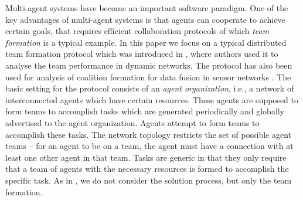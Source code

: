 \documentclass{llncs}
\begin{document}
Multi-agent systems have become an important software paradigm. One of the key advantages of multi-agent systems is that agents can cooperate to achieve certain goals, that requires efficient collaboration protocols of which \emph{team formation} is a typical example. In this paper we focus on a typical distributed team formation protocol which was introduced in \cite{gaston2005agent}, where authors used it to analyse the team performance in dynamic networks. The protocol %
has also been used for analysis of coalition formation for data fusion in sensor networks \cite{glinton2008agent}. The basic setting for the protocol consists of an \emph{agent organization}, i.e., a network of interconnected agents which have certain resources. These agents are supposed to form teams to accomplish tasks which are generated periodically and globally advertised to the agent organization. Agents attempt to form teams to accomplish these tasks. The network topology restricts the set of possible agent teams -- for an agent to be on a team, the agent must have a connection with at least one other agent in that team. Tasks are generic in that they only require that a team of agents with the necessary resources is formed to accomplish the specific task. As in \cite{gaston2005agent}, we do not consider the solution process, but only the team formation.
\end{document}
